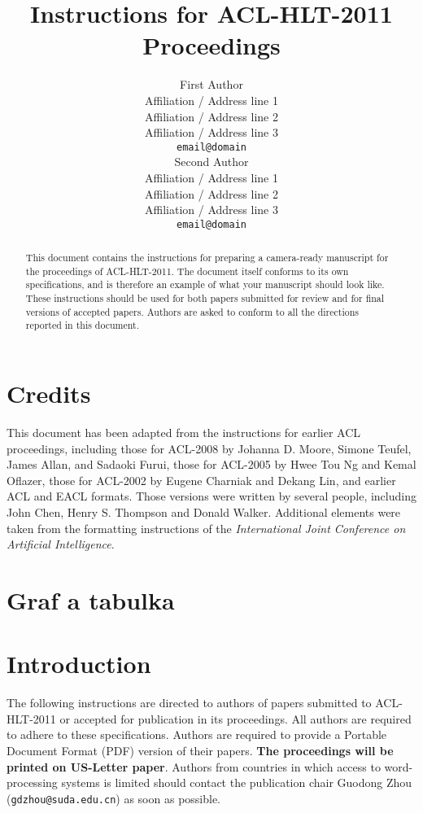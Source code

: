 \documentclass[11pt]{article}
\title{Instructions for ACL-HLT-2011 Proceedings}
\author{First Author \\
  Affiliation / Address line 1 \\
  Affiliation / Address line 2 \\
  Affiliation / Address line 3 \\
  {\tt email@domain} \\\And
  Second Author \\
  Affiliation / Address line 1 \\
  Affiliation / Address line 2 \\
  Affiliation / Address line 3 \\
  {\tt email@domain} \\}
\date{}
\begin{document}
\maketitle
\begin{abstract}
  This document contains the instructions for preparing a camera-ready manuscript for the proceedings of ACL-HLT-2011. The document itself conforms to its own specifications, and is therefore an example of what your manuscript should look like. These instructions should be used for both papers submitted for review and for final versions of accepted papers. Authors are asked to conform to all the directions reported in this document.
\end{abstract}

\section{Credits}

This document has been adapted from the instructions for earlier ACL proceedings, including those for ACL-2008 by Johanna D. Moore, Simone Teufel, James Allan, and Sadaoki Furui, those for ACL-2005 by Hwee Tou Ng and Kemal Oflazer, those for ACL-2002 by Eugene Charniak and Dekang Lin, and earlier ACL and EACL formats. Those versions were written by several people, including John Chen, Henry S. Thompson and Donald Walker. Additional elements were taken from the formatting instructions of the {\em International Joint Conference on Artificial Intelligence}.

\section{Graf a tabulka}


\section{Introduction}

The following instructions are directed to authors of papers submitted to ACL-HLT-2011 or accepted for publication in its proceedings. All authors are required to adhere to these specifications. Authors are required to provide a Portable Document Format (PDF)
version of their papers. \textbf{The proceedings will be printed on US-Letter paper}. Authors from countries in which access to word-processing systems is limited should contact the publication chair Guodong Zhou ({\tt gdzhou@suda.edu.cn}) as soon as possible.
\end{document}
